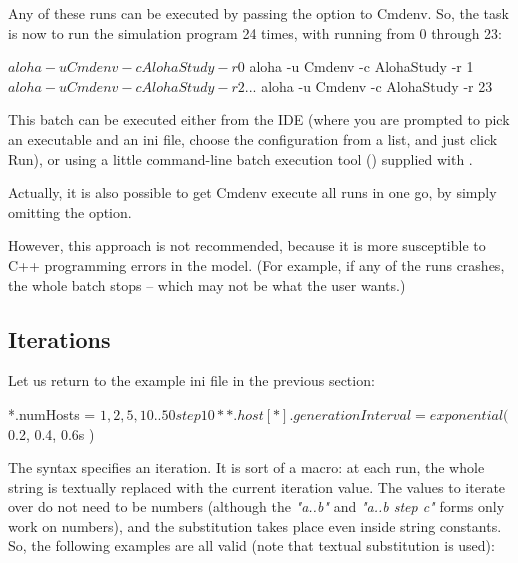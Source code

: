 Any of these runs can be executed by passing the 
option to Cmdenv. So, the task is now to run the simulation program 24
times, with  running from 0 through 23:

\begin{commandline}
$ aloha -u Cmdenv -c AlohaStudy -r 0
$ aloha -u Cmdenv -c AlohaStudy -r 1
$ aloha -u Cmdenv -c AlohaStudy -r 2
...
$ aloha -u Cmdenv -c AlohaStudy -r 23
\end{commandline}

This batch can be executed either from the {\opp} IDE (where you are
prompted to pick an executable and an ini file, choose the configuration
from a list, and just click Run), or using a little command-line
batch execution tool () supplied with {\opp}.

Actually, it is also possible to get Cmdenv execute all runs in one go,
by simply omitting the  option.



However, this approach is not recommended, because it is more
susceptible to C++ programming errors in the model. (For example, if
any of the runs crashes, the whole batch stops -- which may
not be what the user wants.)


\subsection{Iterations}
\label{sec:config-sim:iterations}

Let us return to the example ini file in the previous section:

\begin{inifile}
*.numHosts = ${1, 2, 5, 10..50 step 10}
**.host[*].generationInterval = exponential( ${0.2, 0.4, 0.6}s )
\end{inifile}

The  syntax specifies an iteration. It is sort of a macro: at
each run, the whole  string is textually replaced with the
current iteration value. The values to iterate over do not need to be
numbers (although the \textit{"a..b"} and \textit{"a..b step c"} forms
only work on numbers), and the substitution takes place even inside
string constants. So, the following examples are all valid (note that
textual substitution is used):

